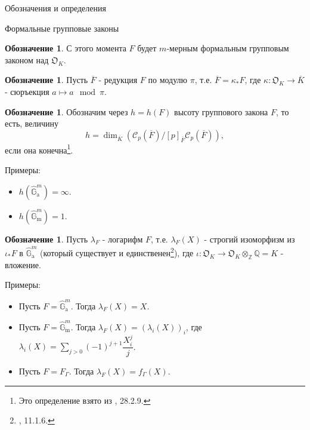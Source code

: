 \documentclass[a4paper,14pt]{extarticle}
\theoremstyle{definition}
\newtheorem{denotation}[definition]{Обозначение}
\newcommand{\bG}{\mathbb{G}}
\newcommand{\bQ}{\mathbb{Q}}
\newcommand{\bZ}{\mathbb{Z}}
\newcommand{\fO}{\mathfrak{O}}
\newcommand{\sC}{\mathscr{C}}
\newcommand{\GGa}{\hat{\bG}_{\mathrm{a}}}
\newcommand{\GGm}{\hat{\bG}_{\mathrm{m}}}
\begin{document}
\begin{section}{Обозначения и определения}
\begin{subsection}{Формальные групповые законы}
\begin{denotation}\label{denote:2.1:F}
    С этого момента $F$ будет $m$-мерным формальным групповым законом над $\fO_K$.
\end{denotation}

\begin{denotation}\label{denote:2.after_F:F_bar}
    Пусть $\overline{F}$ - редукция $F$ по модулю $\pi$, т.е. ${ \overline{F} = \kappa_* F }$, где ${ \kappa : \fO_K \rightarrow \overline{K} }$ - сюръекция ${ a \mapsto a \mod \pi }$.
\end{denotation}

\begin{denotation}\label{denote:2.4:ht(F)}
    Обозначим через ${ h = h(F) }$ высоту группового закона $F$, то есть, величину
    \begin{equation*}
        h =
        \dim_{\overline{K}} \left(
            \sC_p(\overline{F}) /
            [p]_{\overline{F}} \sC_p(\overline{F})
        \right),
    \end{equation*}
    если она конечна\footnote{
        Это определение взято из \cite{Hazewinkel}, 28.2.9.
    }.
\end{denotation}

Примеры:
\begin{itemize}
    \item ${ h(\GGa^m) = \infty }$.
    \item ${ h(\GGm^m) = 1 }$.
\end{itemize}

\begin{denotation}\label{def:2.2:lambda_F}
    Пусть $\lambda_F$ - логарифм $F$, т.е. $\lambda_F(X)$ - строгий изоморфизм из ${ \iota_* F }$ в $\GGa^m$ (который существует и единственен\footnote{
        \cite{Hazewinkel}, 11.1.6.
    }), где ${ \iota : \fO_K \rightarrow \fO_K \otimes_{\bZ} \bQ = K }$ - вложение.
\end{denotation}

Примеры:
\begin{itemize}
    \item Пусть ${ F = \GGa^m }$. Тогда ${ \lambda_F(X) = X }$.
    \item Пусть ${ F = \GGm^m }$. Тогда ${ \lambda_F(X) = (\lambda_i(X))_i }$, где ${ \lambda_i(X) = \sum\limits_{j > 0} (-1)^{j + 1} \dfrac{X_i^j}{j} }$.
    \item Пусть ${ F = F_\Gamma }$. Тогда ${ \lambda_F(X) = f_\Gamma(X) }$.
\end{itemize}


\end{subsection}
\end{section}
\end{document}
